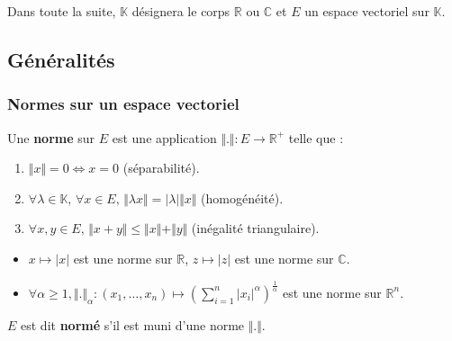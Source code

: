 



  Dans toute la suite, $\mathbb{K}$ désignera le corps $\mathbb{R}$ ou $\mathbb{C}$ et $E$ un espace vectoriel sur $\mathbb{K}$.

  \subsection{Généralités}

  \subsubsection{Normes sur un espace vectoriel}


  \begin{definition}
    Une \textbf{norme} sur $E$ est une application $\Vert . \Vert : E \rightarrow \mathbb{R}^+$ telle que :
    \begin{enumerate}[label=(\roman*)]
      \item $\Vert x \Vert = 0 \iff x = 0$ (séparabilité).
      \item $\forall \lambda \in \mathbb{K}, \, \forall x \in E, \, \Vert \lambda x \Vert = \vert \lambda \vert \Vert x \Vert$ (homogénéité).
      \item $\forall x, y \in E, \, \Vert x + y \Vert \leq \Vert x \Vert + \Vert y \Vert$ (inégalité triangulaire).
    \end{enumerate}
  \end{definition}

  \begin{example}
    \label{208-1}
    \begin{itemize}
      \item $x \mapsto \vert x \vert$ est une norme sur $\mathbb{R}$, $z \mapsto \vert z \vert$ est une norme sur $\mathbb{C}$.
      \item $\forall \alpha \geq 1, \Vert . \Vert_\alpha : (x_1, \dots, x_n) \mapsto \left(\sum_{i=1}^n \vert x_i \vert^\alpha\right)^{\frac{1}{\alpha}}$ est une norme sur $\mathbb{R}^n$.
    \end{itemize}
  \end{example}


  \begin{definition}
    $E$ est dit \textbf{normé} s'il est muni d'une norme $\Vert . \Vert$.
  \end{definition}

